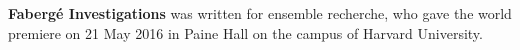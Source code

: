 \textbf{Faberg\'{e} Investigations} was written for ensemble recherche, who
gave the world premiere on 21 May 2016 in Paine Hall on the campus of Harvard
University.
